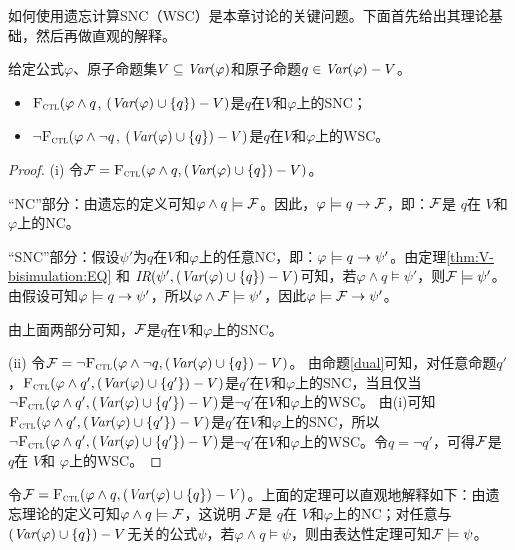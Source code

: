 如何使用遗忘计算SNC（WSC）是本章讨论的关键问题。下面首先给出其理论基础，然后再做直观的解释。

\begin{theorem}\label{thm:SNC:WSC:forget}
	给定公式$\varphi$、原子命题集$V\subseteq\textit{Var}(\varphi)$和原子命题$q\in\textit{Var}(\varphi)- V$。
	\begin{itemize}
		\item[(i)] ${\textsc{F}_{\textsc{ctl}}} (\varphi \land q$, $(\textit{Var}(\varphi) \cup \{q\}) - V)$是$q$在$V$和$\varphi$上的SNC；
		\item[(ii)]  $\neg{\textsc{F}_{\textsc{ctl}}} (\varphi \land \neg q$, $(\textit{Var}(\varphi) \cup \{q\}) - V)$是$q$在$V$和$\varphi$上的WSC。
	\end{itemize}
\end{theorem}
\begin{proof}
	(i) 令${\cal F}={\textsc{F}_{\textsc{ctl}}}(\varphi \wedge q, (\textit{Var}(\varphi) \cup \{q\})- V)$。
	
	
	“NC”部分：由遗忘的定义可知$\varphi \wedge q \models {\cal F}$。因此，$\varphi\models q \rightarrow {\cal F}$，即：${\cal F}$是 $q$在 $V$和$\varphi$上的NC。
	
	“SNC”部分：假设$\psi'$为$q$在$V$和$\varphi$上的任意NC，即：$\varphi\models q \rightarrow \psi'$。由定理\ref{thm:V-bisimulation:EQ} 和 $\emph{IR}(\psi', (\textit{Var}(\varphi) \cup \{q\})- V)$可知，若$\varphi \wedge q \models \psi'$，则${\cal F} \models \psi'$。
	由假设可知$\varphi\models q \rightarrow \psi'$，所以$\varphi \wedge {\cal F} \models \psi'$，因此$\varphi \models {\cal F} \rightarrow \psi'$。
	
	由上面两部分可知，${\cal F}$是$q$在$V$和$\varphi$上的SNC。
	
	(ii) 令${\cal F}=\neg {\textsc{F}_{\textsc{ctl}}}(\varphi \wedge \neg q, (\textit{Var}(\varphi) \cup \{q\})- V)$。
	由命题\ref{dual}可知，对任意命题$q'$，${\textsc{F}_{\textsc{ctl}}}(\varphi \wedge q', (\textit{Var}(\varphi) \cup \{q'\})- V)$是$q'$在$V$和$\varphi$上的SNC，当且仅当
	$\neg {\textsc{F}_{\textsc{ctl}}}(\varphi \wedge q', (\textit{Var}(\varphi) \cup \{q'\})- V)$是$\neg q'$在$V$和$\varphi$上的WSC。
	由(i)可知${\textsc{F}_{\textsc{ctl}}}(\varphi \wedge q', (\textit{Var}(\varphi) \cup \{q'\})- V)$是$q'$在$V$和$\varphi$上的SNC，所以$\neg {\textsc{F}_{\textsc{ctl}}}(\varphi \wedge q', (\textit{Var}(\varphi) \cup \{q'\})- V)$是$\neg q'$在$V$和$\varphi$上的WSC。令$q=\neg q'$，可得${\cal F}$是 $q$在 $V$和 $\varphi$上的WSC。
\end{proof}

令${\cal F}={\textsc{F}_{\textsc{ctl}}}(\varphi \wedge q, (\textit{Var}(\varphi) \cup \{q\})- V)$。上面的定理可以直观地解释如下：由遗忘理论的定义可知$\varphi \wedge q \models {\cal F}$，这说明
${\cal F}$是 $q$在 $V$和$\varphi$上的NC；对任意与$(\textit{Var}(\varphi) \cup \{q\})- V$无关的公式$\psi$，若$\varphi \wedge q \models \psi$，则由表达性定理可知${\cal F} \models \psi$。

